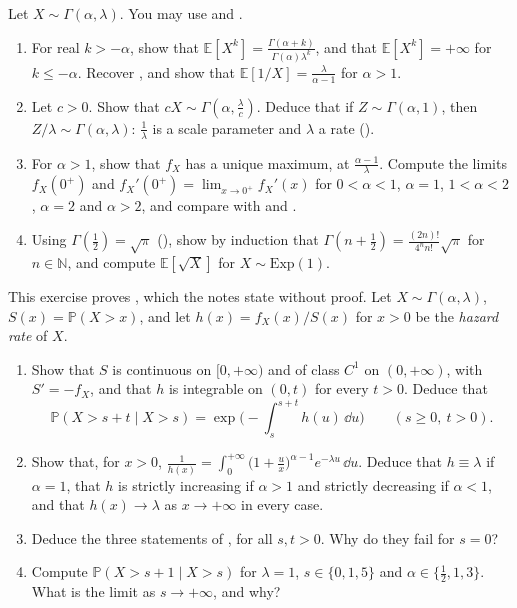 \begin{exercise}\label{ex:tr-gamma-scale}
\easy Let $X\sim\Gamma(\alpha,\lambda)$. You may use  and
.
\begin{enumerate}[label=(\alph*)]
  \item For real $k>-\alpha$, show that
    $\mathbb E[X^k]=\frac{\Gamma(\alpha+k)}{\Gamma(\alpha)\lambda^k}$, and that $\mathbb E[X^k]=+\infty$ for
    $k\le-\alpha$. Recover , and show that
    $\mathbb E[1/X]=\frac\lambda{\alpha-1}$ for $\alpha>1$.
  \item Let $c>0$. Show that $cX\sim\Gamma(\alpha,\frac\lambda c)$. Deduce that if
    $Z\sim\Gamma(\alpha,1)$, then $Z/\lambda\sim\Gamma(\alpha,\lambda)$: $\frac1\lambda$ is a scale
    parameter and $\lambda$ a rate ().
  \item For $\alpha>1$, show that $f_X$ has a unique maximum, at $\frac{\alpha-1}\lambda$. Compute
    the limits $f_X(0^+)$ and $f_X'(0^+)=\lim_{x\to0^+}f_X'(x)$ for $0<\alpha<1$, $\alpha=1$,
    $1<\alpha<2$, $\alpha=2$ and $\alpha>2$, and compare with  and
    .
  \item Using $\Gamma(\frac12)=\sqrt\pi$ (), show by induction that
    $\Gamma(n+\frac12)=\frac{(2n)!}{4^nn!}\sqrt\pi$ for $n\in\mathbb N$, and compute
    $\mathbb E[\sqrt X]$ for $X\sim\mathrm{Exp}(1)$.
\end{enumerate}
\end{exercise}

\begin{exercise}\label{ex:tr-ageing}
\hard This exercise proves , which the notes state without proof. Let
$X\sim\Gamma(\alpha,\lambda)$, $S(x)=\mathbb P(X>x)$, and let $h(x)=f_X(x)/S(x)$ for $x>0$ be the
\emph{hazard rate} of $X$.
\begin{enumerate}[label=(\alph*)]
  \item Show that $S$ is continuous on $[0,+\infty)$ and of class $C^1$ on $(0,+\infty)$, with
    $S'=-f_X$, and that $h$ is integrable on $(0,t)$ for every $t>0$. Deduce that
    \[
      \mathbb P(X>s+t\mid X>s)=\exp\Big(-\int_s^{s+t}h(u)\,\dd u\Big)\qquad(s\ge0,\ t>0).
    \]
  \item Show that, for $x>0$,
    $\frac1{h(x)}=\int_0^{+\infty}\big(1+\frac ux\big)^{\alpha-1}e^{-\lambda u}\,\dd u$. Deduce that
    $h\equiv\lambda$ if $\alpha=1$, that $h$ is strictly increasing if $\alpha>1$ and strictly
    decreasing if $\alpha<1$, and that $h(x)\to\lambda$ as $x\to+\infty$ in every case.
  \item Deduce the three statements of , for all $s,t>0$. Why do they fail
    for $s=0$?
  \item Compute $\mathbb P(X>s+1\mid X>s)$ for $\lambda=1$, $s\in\{0,1,5\}$ and
    $\alpha\in\{\frac12,1,3\}$. What is the limit as $s\to+\infty$, and why?
\end{enumerate}
\end{exercise}

